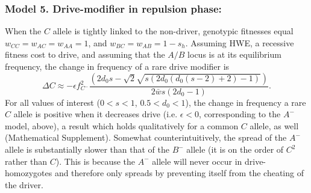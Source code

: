 \documentclass[12pt,letterpaper]{article}
\newcommand{\yb}[1]{{ \color{blue} #1}}
\begin{document}
\subsubsection*{Model 5. Drive-modifier in repulsion phase:}
When the $C$ allele is tightly linked to the non-driver, 
	genotypic fitnesses equal $w_{CC}=w_{AC}=w_{AA}=1$, and $w_{BC}=w_{AB}=1-s_h$. 
Assuming HWE, a recessive fitness cost to drive, and assuming that the $A/B$ locus is at its equilibrium frequency, the change in frequency of a rare drive modifier is
\begin{equation}
	\Delta C \approx -\epsilon f_{C^-}^2 \frac{ \left(2 d_0 s-\sqrt{2} \sqrt{s (2 d_0 (d_0 (s-2)+2)-1)}\right)}{2\bar{w}s (2 d_0 -1) }. \label{A-}
\end{equation}
For all values of interest ($0<s<1$, $0.5<d_0<1$), the change in frequency a rare $C$ allele is positive when it decreases drive (i.e. $\epsilon <0$, corresponding to the $A^-$ model, above), a result which holds qualitatively for a common $C$ allele, as well (Mathematical Supplement). 
Somewhat counterintuitively, the spread of the $A^-$ allele is substantially slower than that of the $B^-$ allele (it is on the order of $C^{2}$ rather than $C$). 
This is because the $A^-$ allele will never occur in drive-homozygotes and therefore only spreads by preventing itself from the cheating of the driver.
\end{document}
